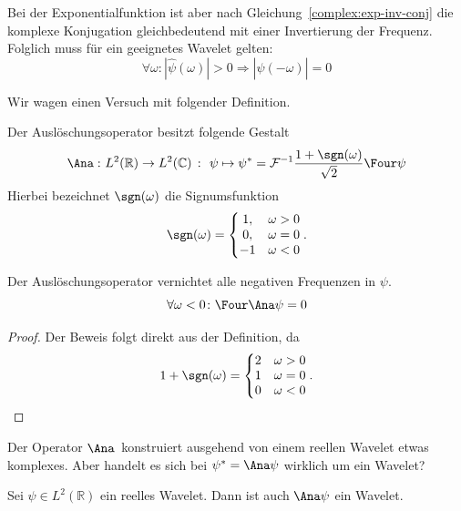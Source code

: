Bei der Exponentialfunktion ist aber nach Gleichung~\ref{complex:exp-inv-conj} die komplexe Konjugation gleichbedeutend mit einer Invertierung der Frequenz.
Folglich muss für ein geeignetes Wavelet gelten:
\[ \forall \omega \colon |\hat\psi(\omega)| > 0 \Rightarrow |\hat\psi(-\omega)| = 0 \]

Wir wagen einen Versuch mit folgender Definition.
\begin{definition}
	Der Auslöschungsoperator besitzt folgende Gestalt
		\[\Ana\, \colon L^2(\mathbb R) \to L^2(\mathbb C)
		~\colon~
		\psi \mapsto \psi^\ast = \mathcal{F}^{-1}\frac{1+\sgn(\omega)}{\sqrt 2}\Four \psi\]
	Hierbei bezeichnet $\sgn(\omega)$ die Signumsfunktion
	\[\sgn(\omega) = \left\lbrace\begin{matrix} 1, & \omega > 0 \\ 0, &\omega = 0 \\ -1 & \omega < 0 \end{matrix}\right..\]
\end{definition}
\begin{lemma}
	Der Auslöschungsoperator vernichtet alle negativen Frequenzen in $\psi$.
	\[\forall \omega < 0 \colon \Four\Ana \psi = 0\]
\end{lemma}
\begin{proof}
	Der Beweis folgt direkt aus der Definition, da
	\[
		1+\sgn(\omega) = 
		\left\lbrace\begin{matrix}
		2 & \omega > 0\\
		1 & \omega = 0\\
		0 & \omega < 0
		\end{matrix}\right..\qedhere
	\]
\end{proof}
Der Operator $\Ana\,$ konstruiert ausgehend von einem reellen Wavelet etwas komplexes.
Aber handelt es sich bei $\psi^\ast = \Ana\psi$ wirklich um ein Wavelet?

\begin{satz}
	Sei $\psi \in L^2(\mathbb R)$ ein reelles Wavelet.
	Dann ist auch $\Ana\psi$ ein Wavelet.
\end{satz}

